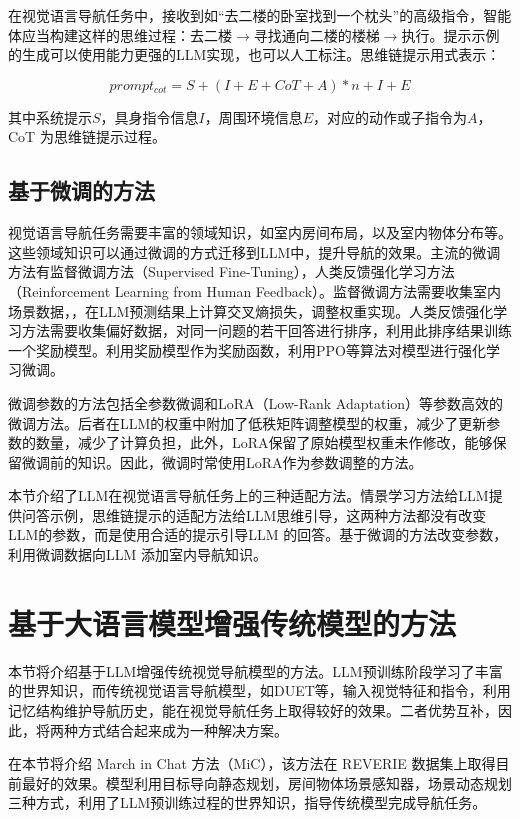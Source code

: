 \documentclass[bachelor]{thesis-uestc}
\begin{document}
在视觉语言导航任务中，接收到如“去二楼的卧室找到一个枕头”的高级指令，智能体应当构建这样的思维过程：去二楼$\rightarrow$寻找通向二楼的楼梯$\rightarrow$执行。提示示例的生成可以使用能力更强的LLM实现，也可以人工标注。思维链提示用式表示：

\begin{equation}
    prompt_{cot} = S+(I+E+CoT+A)*n+I+E
\label{cot}
\end{equation}

其中系统提示$S$，具身指令信息$I$，周围环境信息$E$，对应的动作或子指令为$A$，CoT 为思维链提示过程。

\subsection{基于微调的方法}

视觉语言导航任务需要丰富的领域知识，如室内房间布局，以及室内物体分布等。这些领域知识可以通过微调的方式迁移到LLM中，提升导航的效果。主流的微调方法有监督微调方法（Supervised Fine-Tuning），人类反馈强化学习方法（Reinforcement Learning from Human Feedback）。监督微调方法需要收集室内场景数据，，在LLM预测结果上计算交叉熵损失，调整权重实现。人类反馈强化学习方法需要收集偏好数据，对同一问题的若干回答进行排序，利用此排序结果训练一个奖励模型。利用奖励模型作为奖励函数，利用PPO等算法对模型进行强化学习微调。

微调参数的方法包括全参数微调和LoRA（Low-Rank Adaptation）等参数高效的微调方法。后者在LLM的权重中附加了低秩矩阵调整模型的权重，减少了更新参数的数量，减少了计算负担，此外，LoRA保留了原始模型权重未作修改，能够保留微调前的知识。因此，微调时常使用LoRA作为参数调整的方法。

本节介绍了LLM在视觉语言导航任务上的三种适配方法。情景学习方法给LLM提供问答示例，思维链提示的适配方法给LLM思维引导，这两种方法都没有改变LLM的参数，而是使用合适的提示引导LLM 的回答。基于微调的方法改变参数，利用微调数据向LLM 添加室内导航知识。

\section{基于大语言模型增强传统模型的方法}

本节将介绍基于LLM增强传统视觉导航模型的方法。LLM预训练阶段学习了丰富的世界知识，而传统视觉语言导航模型，如DUET等，输入视觉特征和指令，利用记忆结构维护导航历史，能在视觉导航任务上取得较好的效果。二者优势互补，因此，将两种方式结合起来成为一种解决方案。

在本节将介绍 March in Chat 方法（MiC），该方法在 REVERIE 数据集上取得目前最好的效果。模型利用目标导向静态规划，房间物体场景感知器，场景动态规划三种方式，利用了LLM预训练过程的世界知识，指导传统模型完成导航任务。
\end{document}
